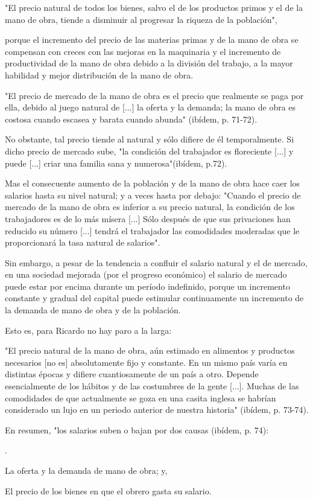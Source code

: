 \documentclass[10pt,a4paper]{article}
\newcounter{numitem}
\newenvironment{lnum}
      {\begin{list}{\arabic{numitem}.}{%
          \usecounter{numitem}%
          \setlength{\leftmargin}{1cm}%
          \setlength{\parskip}{3pt}%
          \setlength{\itemsep}{0pt}%
          \setlength{\parsep}{0pt}%
      }}
      {\end{list}}
\begin{document}
"El precio natural de todos los bienes, salvo el de los productos primos y el de la mano de obra, tiende a disminuir al progresar la riqueza de la población", 

porque el incremento del precio de las materias primas y de la mano de obra se compensan con creces con las mejoras en la maquinaria y el incremento de productividad de la mano de obra debido a la división del trabajo, a la mayor habilidad y mejor distribución de la mano de obra. 

"El precio de mercado de la mano de obra es el precio que realmente se paga por ella, debido al juego natural de [...] la oferta y la demanda; la mano de obra es costosa cuando escasea y barata cuando abunda" (ibídem, p. 71-72).

No obstante, tal precio tiende al natural y sólo difiere de él temporalmente. Si dicho precio de mercado sube, "la condición del trabajador es floreciente [...] y puede [...] criar una familia sana y numerosa"(ibídem, p.72). 

Mas el consecuente aumento de la población y de la mano de obra hace caer los salarios hasta su nivel natural; y a veces hasta por debajo: "Cuando el precio de mercado de la mano de obra es inferior a su precio natural, la condición de los trabajadores es de lo más mísera [...] Sólo después de que sus privaciones han reducido su número [...] tendrá el trabajador las comodidades moderadas que le proporcionará la tasa natural de salarios". 

Sin embargo, a pesar de la tendencia a confluir el salario natural y el de mercado, en una sociedad mejorada (por el progreso económico) el salario de mercado puede estar por encima durante un período indefinido, porque un incremento constante y gradual del capital puede estimular continuamente un incremento de la demanda de mano de obra y de la población. 

Esto es, para Ricardo no hay paro a la larga:

"El precio natural de la mano de obra, aún estimado en alimentos y productos necesarios [no es] absolutamente fijo y constante. En un mismo país varía en distintas épocas y difiere cuantiosamente de un país a otro. Depende esencialmente de los hábitos y de las costumbres de la gente [...]. Muchas de las comodidades de que actualmente se goza en una casita inglesa se habrían considerado un lujo en un periodo anterior de nuestra historia" (ibídem, p. 73-74). 

En resumen, "los salarios suben o bajan por dos causas (ibídem, p. 74):
\begin{lnum}
    \item La oferta y la demanda de mano de obra; y,
    \item El precio de los bienes en que el obrero gasta su salario.
\end{lnum}
\end{document}

